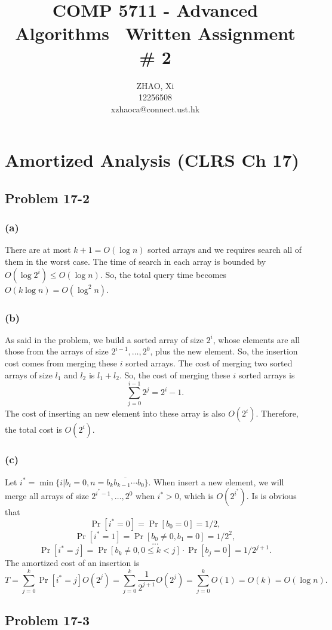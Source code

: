 \documentclass[12pt,onecolumn,a4paper]{article}
\title{\textbf{COMP 5711 - Advanced Algorithms} \ \textbf{Written Assignment \# 2}}
\author{ZHAO, Xi \\12256508 \\xzhaoca@connect.ust.hk}
\begin{document}
\maketitle

\section*{Amortized Analysis (CLRS Ch 17)}
\subsection*{Problem 17-2}
\subsubsection*{(a)} 
There are at most $k+1=O(\log n)$ sorted arrays and we requires search all of them in the worst case. The time of search in each array is bounded by $O(\log 2^i)\le O(\log n)$. So, the total query time becomes $O(k\log n)=O(\log^2 n)$.

\subsubsection*{(b)} 
As said in the problem, we build a sorted array of size $2^i$, whose elements are all those from the arrays of size $2^{i-1},\dots,2^0$, plus the new element. So, the insertion cost comes from merging these $i$ sorted arrays. The cost of merging two sorted arrays of size $l_1$ and $l_2$ is $l_1+l_2$. So, the cost of merging these $i$ sorted arrays is 
$$\sum_{j=0}^{i-1} 2^j=2^i-1.$$ The cost of inserting an new element into these array is also $O(2^i)$. Therefore, the total cost is $O(2^i)$.

\subsubsection*{(c)} 
Let $i^*=\min\{i|b_i=0,n=\overline{b_kb_{k-1}\cdots b_0}\}$. When insert a new element, we will merge all arrays of size $2^{i^*-1},\dots,2^0$ when $i^*>0$, which is $O(2^{i^*})$. Is is obvious that
$$\Pr[i^*=0]=\Pr[b_0=0]=1/2,$$
$$\Pr[i^*=1]=\Pr[b_0\neq0,b_1=0]=1/2^2,$$
$$...$$
$$\Pr[i^*=j]=\Pr[b_k\neq0,0\le k<j]\cdot\Pr[b_j=0]=1/2^{j+1}.$$
The amortized cost of an insertion is
$$T=\sum_{j=0}^{k} \Pr[i^*=j]O(2^j)=\sum_{j=0}^{k} \frac{1}{2^{j+1}}O(2^j)=\sum_{j=0}^{k} O(1)=O(k)=O(\log n).$$
\subsection*{Problem 17-3}
\end{document}
